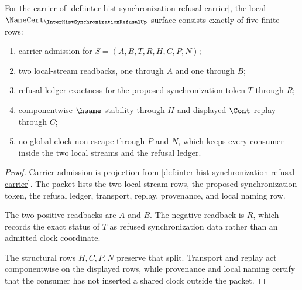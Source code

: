 \begin{theorem}
\label{thm:inter-hist-synchronization-refusal-namecert-obligations}
For the carrier of \autoref{def:inter-hist-synchronization-refusal-carrier}, the local $\NameCert_{\InterHistSynchronizationRefusalUp}$ surface consists exactly of five finite rows:
\begin{enumerate}
\item carrier admission for $S=(A,B,T,R,H,C,P,N)$;
\item two local-stream readbacks, one through $A$ and one through $B$;
\item refusal-ledger exactness for the proposed synchronization token $T$ through $R$;
\item componentwise $\hsame$ stability through $H$ and displayed $\Cont$ replay through $C$;
\item no-global-clock non-escape through $P$ and $N$, which keeps every consumer inside the two local streams and the refusal ledger.
\end{enumerate}
\end{theorem}
\begin{proof}
Carrier admission is projection from \autoref{def:inter-hist-synchronization-refusal-carrier}. The packet lists the two local stream rows, the proposed synchronization token, the refusal ledger, transport, replay, provenance, and local naming row.

The two positive readbacks are $A$ and $B$. The negative readback is $R$, which records the exact status of $T$ as refused synchronization data rather than an admitted clock coordinate.

The structural rows $H,C,P,N$ preserve that split. Transport and replay act componentwise on the displayed rows, while provenance and local naming certify that the consumer has not inserted a shared clock outside the packet.
\end{proof}


